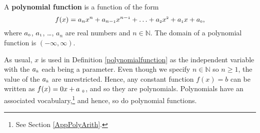 \documentclass{ximera}
\begin{document}


\begin{definition} \label{polynomialfunction} A \textbf{polynomial function} is a function of the form \[ f(x) = a_{n} x^{n} + a_{n-\mbox{\tiny$1$}} x^{n-\mbox{\tiny$1$}} + \ldots + a_{\mbox{\tiny $2$}} x^{\mbox{\tiny $2$}} + a_{\mbox{\tiny $1$}} x + a_{\mbox{\tiny $0$}},\] where $a_{\mbox{\tiny $0$}}$, $a_{\mbox{\tiny $1$}}$, \ldots, $a_{n}$ are real numbers and $n \in \mathbb{N}$.  The domain of a polynomial function is $(-\infty, \infty)$.

\end{definition}



As usual, $x$ is used in Definition \ref{polynomialfunction}  as the independent variable with the $a_{\mbox{\tiny $k$}}$ each being a parameter.  Even though we specify $n  \in  \mathbb{N}$ so $n \geq 1$, the value of the $a_{\mbox{\tiny $k$}}$ are unrestricted. Hence, any constant function $f(x) = b$ can be written as $f(x) = 0 x + a_{\mbox{ \tiny$0$}}$, and so they are polynomials.  Polynomials have an associated vocabulary,\footnote{See Section \ref{AppPolyArith}.}  and hence, so do polynomial functions.


\end{document}
